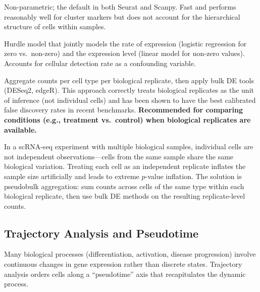 \begin{description}[style=nextline]
  \item[Wilcoxon rank-sum test] Non-parametric; the default in both Seurat and
    Scanpy. Fast and performs reasonably well for cluster markers but does not
    account for the hierarchical structure of cells within samples.
  \item[\software{MAST}] Hurdle model that jointly models the rate of
    expression (logistic regression for zero vs.\ non-zero) and the expression
    level (linear model for non-zero values). Accounts for cellular detection
    rate as a confounding variable.
  \item[Pseudobulk approaches] Aggregate counts per cell type per biological
    replicate, then apply bulk DE tools (DESeq2, edgeR). This approach correctly
    treats biological replicates as the unit of inference (not individual
    cells) and has been shown to have the best calibrated false discovery rates
    in recent benchmarks. \textbf{Recommended for comparing conditions (e.g.,
    treatment vs.\ control) when biological replicates are available.}
\end{description}

\begin{keyconcept}[title={The Pseudobulk Principle}]
In a scRNA-seq experiment with multiple biological samples, individual cells
are not independent observations---cells from the same sample share the same
biological variation. Treating each cell as an independent replicate inflates
the sample size artificially and leads to extreme $p$-value inflation. The
solution is pseudobulk aggregation: sum counts across cells of the same type
within each biological replicate, then use bulk DE methods on the resulting
replicate-level counts.
\end{keyconcept}

\subsection{Trajectory Analysis and Pseudotime}

Many biological processes (differentiation, activation, disease progression)
involve continuous changes in gene expression rather than discrete states.
Trajectory analysis orders cells along a ``pseudotime'' axis that recapitulates
the dynamic process.

